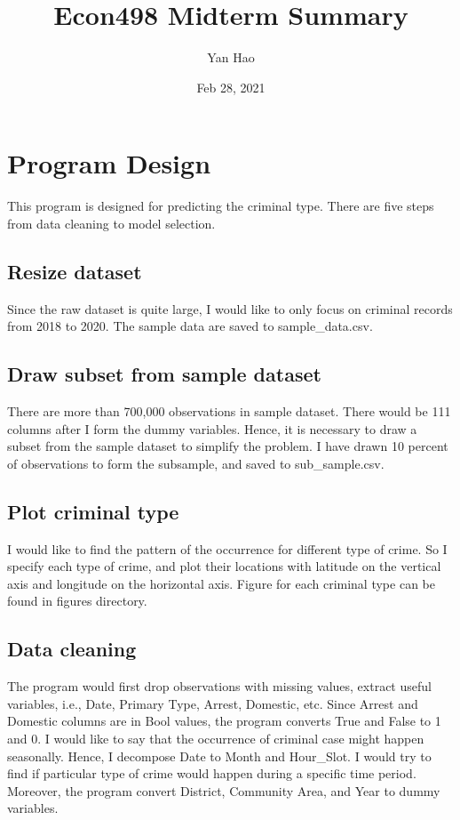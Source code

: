 \documentclass[12pt]{article}
\title{Econ498 Midterm Summary}
\author{Yan Hao}
\date{Feb 28, 2021}
\begin{document}
\maketitle
\newpage

\section{Program Design}


This program is designed for predicting the criminal type. There are five
steps from data cleaning to model selection.

\subsection{Resize dataset}
Since the raw dataset is quite large, I would like to only focus on criminal
records from 2018 to 2020. The sample data are saved to sample\_data.csv.

\subsection{Draw subset from sample dataset}
There are more than 700,000 observations in sample dataset. There would be 111
columns after I form the dummy variables. Hence, it is necessary to draw a
subset from the sample dataset to simplify the problem. I have drawn 10 percent
of observations to form the subsample, and saved to sub\_sample.csv.

\subsection{Plot criminal type}
I would like to find the pattern of the occurrence for different type of crime.
So I specify each type of crime, and plot their locations with latitude on the
vertical axis and longitude on the horizontal axis. Figure for each criminal
type can be found in figures directory. 

\subsection{Data cleaning}
The program would first drop observations with missing values, extract useful
variables, i.e., Date, Primary Type, Arrest, Domestic, etc. Since Arrest and
Domestic columns are in Bool values, the program converts True and False to
1 and 0. I would like to say that the occurrence of criminal case might 
happen seasonally. Hence, I decompose Date to Month and Hour\_Slot. I would
try to find if particular type of crime would happen during a specific time
period. Moreover, the program convert District, Community Area, and Year 
to dummy variables.
\end{document}
